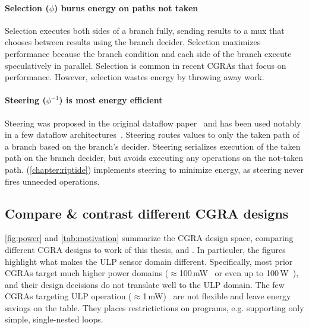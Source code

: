 \paragraph{Selection ($\phi$) burns energy on paths not taken}
Selection executes both sides of a branch fully, sending results to a mux that
chooses between results using the branch decider.
%
Selection maximizes performance because the branch condition and each side of the branch execute speculatively in parallel.
%
Selection is common in recent CGRAs that focus on performance.
% 
However, selection wastes energy by throwing away work.

\paragraph{Steering ($\phi^{-1}$) is most energy efficient}
%
Steering was proposed in the original dataflow paper~\cite{dennis1975preliminary}
and has been used notably in a few dataflow architectures~\cite{swanson2003wavescalar,dataflow-a-complement,mishra2006tartan,beret,seed}.
% 
Steering routes values to only the taken path of a branch based on the branch's
decider.
%
Steering serializes execution of the taken path on the branch decider, but
avoids executing any operations on the not-taken path.
%
\riptide (\autoref{chapter:riptide}) implements steering to minimize energy,
as steering never fires unneeded operations. 

\figPower
\tabMotivate
\subsection{Compare \& contrast different CGRA designs}
\autoref{fig:power} and \autoref{tab:motivation} summarize the CGRA design space, comparing different CGRA designs to work of this thesis, \snafu and \riptide.
% 
In particuler, the figures highlight what makes the ULP sensor domain different.
% 
Specifically, most prior CGRAs target much higher power domains ($\approx$100\,mW~\cite{weng2020dsagen,karunaratne2017hycube,nowatzki:isca17:stream-dataflow,tan2018stitch,weng2020hybrid} or even up to 100\,W~\cite{plasticine,voitsechov2014single}),
and their design decisions do not translate well to the ULP domain.
%
The few CGRAs targeting ULP operation ($\approx$1\,mW)~\cite{ipa,cma,srp} are not flexible and leave energy savings on the table. 
% 
They places restrictictions on programs, e.g. supporting only simple, single-nested loops.


